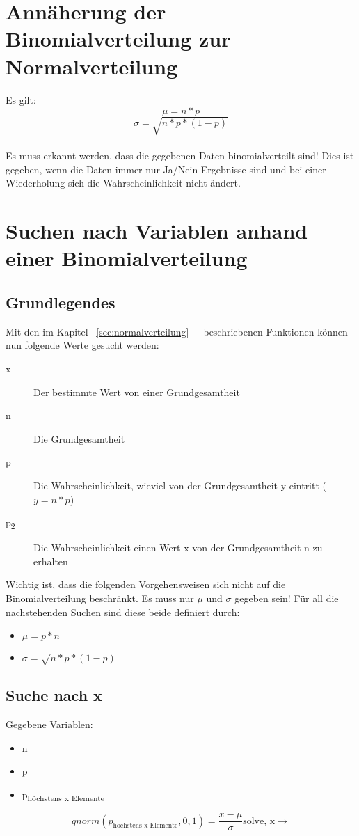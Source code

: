 \documentclass[a4paper,10pt]{article}
\begin{document}
\section{Annäherung der Binomialverteilung zur Normalverteilung}
Es gilt:
\begin{equation}
  \mu = n * p
\end{equation}
\begin{equation}
  \sigma = \sqrt{n * p * (1 - p)}
\end{equation}
\\
Es muss erkannt werden, dass die gegebenen Daten binomialverteilt
sind! Dies ist gegeben, wenn die Daten immer nur Ja/Nein Ergebnisse
sind und bei einer Wiederholung sich die Wahrscheinlichkeit nicht
ändert.
\section{Suchen nach Variablen anhand einer Binomialverteilung}
\subsection{Grundlegendes}
\label{sec:variabliensuchebinomialverteilunggrundlegendes}
Mit den im Kapitel ~\autoref{sec:normalverteilung}
-~ beschriebenen Funktionen können nun
folgende Werte gesucht werden:
\begin{description}
\item[x] Der bestimmte Wert von einer Grundgesamtheit
\item[n] Die Grundgesamtheit
\item[p] Die Wahrscheinlichkeit, wieviel von der Grundgesamtheit y
  eintritt ($ y = n * p $)
\item[p\textsubscript{2}] Die Wahrscheinlichkeit einen Wert x von der
  Grundgesamtheit n zu erhalten
\end{description}
Wichtig ist, dass die folgenden Vorgehensweisen sich nicht auf die
Binomialverteilung beschränkt. Es muss nur $ \mu $ und $ \sigma $
gegeben sein! Für all die nachstehenden Suchen sind diese beide
definiert durch:
\begin{itemize}
\item $\mu = p * n $
\item $ \sigma = \sqrt{n * p * (1  - p)} $
\end{itemize}

\subsection{Suche nach x}
Gegebene Variablen:
\begin{itemize}
\item n
\item p
\item p\textsubscript{höchstens x Elemente}
\end{itemize}
\begin{equation}
  qnorm(p_{\text{höchstens x Elemente}}, 0, 1) = \frac{x -\mu}{\sigma} \text{solve, x} \rightarrow
\end{equation}
\end{document}
